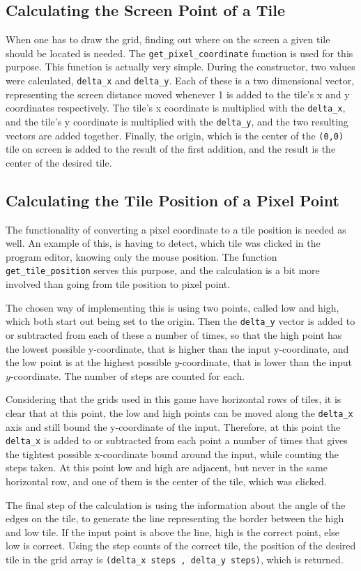 \subsection{Calculating the Screen Point of a Tile}
When one has to draw the grid, finding out where on the screen a given tile should be located is needed.
The \texttt{get\_pixel\_coordinate} function is used for this purpose.
This function is actually very simple.
During the constructor, two values were calculated, \verb|delta_x| and \verb|delta_y|.
Each of these is a two dimensional vector, representing the screen distance moved whenever 1 is added to the tile's x and y coordinates respectively.
The tile's x coordinate is multiplied with the \verb|delta_x|, and the tile's y coordinate is multiplied with the \verb|delta_y|, and the two resulting vectors are added together.
Finally, the origin, which is the center of the \texttt{(0,0)} tile on screen is added to the result of the first addition, and the result is the center of the desired tile.

\subsection{Calculating the Tile Position of a Pixel Point}
The functionality of converting a pixel coordinate to a tile position is needed as well.
An example of this, is having to detect, which tile was clicked in the program editor, knowing only the mouse position.
The function \verb|get_tile_position| serves this purpose, and the calculation is a bit more involved than going from tile position to pixel point.

The chosen way of implementing this is using two points, called low and high, which both start out being set to the origin.
Then the \verb|delta_y| vector is added to or subtracted from each of these a number of times, so that the high point has the lowest possible y-coordinate, that is higher than the input y-coordinate, and the low point is at the highest possible $y$-coordinate, that is lower than the input $y$-coordinate.
The number of steps are counted for each.

Considering that the grids used in this game have horizontal rows of tiles, it is clear that at this point, the low and high points can be moved along the \verb|delta_x| axis and still bound the y-coordinate of the input. 
Therefore, at this point the \verb|delta_x| is added to or subtracted from each point a number of times that gives the tightest possible x-coordinate bound around the input, while counting the steps taken.
At this point low and high are adjacent, but never in the same horizontal row, and one of them is the center of the tile, which was clicked.

The final step of the calculation is using the information about the angle of the edges on the tile, to generate the line representing the border between the high and low tile.
If the input point is above the line, high is the correct point, else low is correct.
Using the step counts of the correct tile, the position of the desired tile in the grid array is \verb|(delta_x steps , delta_y steps)|, which is returned.